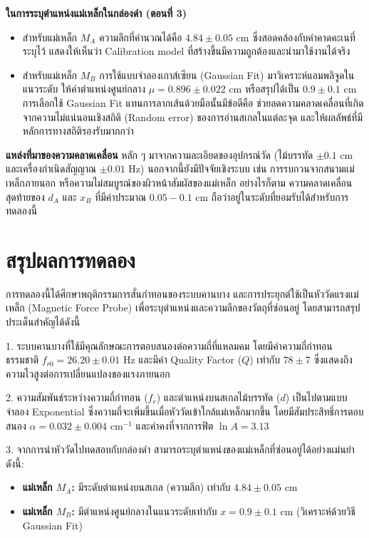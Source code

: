 \documentclass[11pt,a4paper]{article}
\begin{document}
\textbf{ในการระบุตำแหน่งแม่เหล็กในกล่องดำ (ตอนที่ 3)} 
\begin{itemize}
    \item สำหรับแม่เหล็ก $M_A$ ความลึกที่คำนวณได้คือ $4.84 \pm 0.05$ cm ซึ่งสอดคล้องกับค่าคาดคะเนที่ระบุไว้ แสดงให้เห็นว่า Calibration model ที่สร้างขึ้นมีความถูกต้องและนำมาใช้งานได้จริง
    \item สำหรับแม่เหล็ก $M_B$ การใช้แบบจำลองเกาส์เซียน (Gaussian Fit) มาวิเคราะห์แอมพลิจูดในแนวระดับ ให้ค่าตำแหน่งศูนย์กลาง $\mu = 0.896 \pm 0.022$ cm หรือสรุปได้เป็น $0.9 \pm 0.1$ cm การเลือกใช้ Gaussian Fit แทนการลากเส้นด้วยมือนั้นมีข้อดีคือ ช่วยลดความคลาดเคลื่อนที่เกิดจากความไม่แน่นอนเชิงสถิติ (Random error) ของการอ่านสเกลในแต่ละจุด และให้ผลลัพธ์ที่มีหลักการทางสถิติรองรับมากกว่า
\end{itemize}

\textbf{แหล่งที่มาของความคลาดเคลื่อน} หลัก ๆ มาจากความละเอียดของอุปกรณ์วัด (ไม้บรรทัด $\pm 0.1$ cm และเครื่องกำเนิดสัญญาณ $\pm 0.01$ Hz) นอกจากนี้ยังมีปัจจัยเชิงระบบ เช่น การรบกวนจากสนามแม่เหล็กภายนอก หรือความไม่สมบูรณ์ของผิวหน้าสัมผัสของแม่เหล็ก อย่างไรก็ตาม ความคลาดเคลื่อนสุดท้ายของ $d_A$ และ $x_B$ ที่มีค่าประมาณ $0.05-0.1$ cm ถือว่าอยู่ในระดับที่ยอมรับได้สำหรับการทดลองนี้




\newpage
\section{สรุปผลการทดลอง} \label{conclusion}

การทดลองนี้ได้ศึกษาพฤติกรรมการสั่นกำทอนของระบบคานบาง และการประยุกต์ใช้เป็นหัววัดแรงแม่เหล็ก (Magnetic Force Probe) เพื่อระบุตำแหน่งและความลึกของวัตถุที่ซ่อนอยู่ โดยสามารถสรุปประเด็นสำคัญได้ดังนี้

1. ระบบคานบางที่ใช้มีคุณลักษณะการตอบสนองต่อความถี่ที่แหลมคม โดยมีค่าความถี่กำทอนธรรมชาติ $f_{r0} = 26.20 \pm 0.01$ Hz และมีค่า Quality Factor ($Q$) เท่ากับ $78 \pm 7$ ซึ่งแสดงถึงความไวสูงต่อการเปลี่ยนแปลงของแรงภายนอก

2. ความสัมพันธ์ระหว่างความถี่กำทอน ($f_r$) และตำแหน่งบนสเกลไม้บรรทัด ($d$) เป็นไปตามแบบจำลอง Exponential ซึ่งความถี่จะเพิ่มขึ้นเมื่อหัววัดเข้าใกล้แม่เหล็กมากขึ้น โดยมีสัมประสิทธิ์การตอบสนอง $\alpha = 0.032 \pm 0.004 \text{ cm}^{-1}$ และค่าคงที่จากการฟิต $\ln A = 3.13$

3. จากการนำหัววัดไปทดสอบกับกล่องดำ สามารถระบุตำแหน่งของแม่เหล็กที่ซ่อนอยู่ได้อย่างแม่นยำ ดังนี้:
\begin{itemize}
    \item \textbf{แม่เหล็ก $M_A$:} มีระดับตำแหน่งบนสเกล (ความลึก) เท่ากับ $4.84 \pm 0.05$ cm
    \item \textbf{แม่เหล็ก $M_B$:} มีตำแหน่งศูนย์กลางในแนวระดับเท่ากับ $x = 0.9 \pm 0.1$ cm (วิเคราะห์ด้วยวิธี Gaussian Fit)
\end{itemize}
\end{document}

